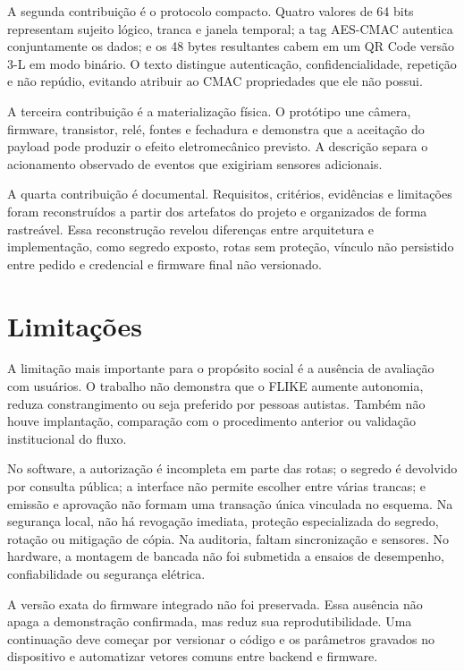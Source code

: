 A segunda contribuição é o protocolo compacto. Quatro valores de 64 bits representam sujeito lógico, tranca e janela temporal; a tag AES-CMAC autentica conjuntamente os dados; e os 48 bytes resultantes cabem em um QR Code versão 3-L em modo binário. O texto distingue autenticação, confidencialidade, repetição e não repúdio, evitando atribuir ao CMAC propriedades que ele não possui.

A terceira contribuição é a materialização física. O protótipo une câmera, firmware, transistor, relé, fontes e fechadura e demonstra que a aceitação do payload pode produzir o efeito eletromecânico previsto. A descrição separa o acionamento observado de eventos que exigiriam sensores adicionais.

A quarta contribuição é documental. Requisitos, critérios, evidências e limitações foram reconstruídos a partir dos artefatos do projeto e organizados de forma rastreável. Essa reconstrução revelou diferenças entre arquitetura e implementação, como segredo exposto, rotas sem proteção, vínculo não persistido entre pedido e credencial e firmware final não versionado.

\section{Limitações}

A limitação mais importante para o propósito social é a ausência de avaliação com usuários. O trabalho não demonstra que o FLIKE aumente autonomia, reduza constrangimento ou seja preferido por pessoas autistas. Também não houve implantação, comparação com o procedimento anterior ou validação institucional do fluxo.

No software, a autorização é incompleta em parte das rotas; o segredo é devolvido por consulta pública; a interface não permite escolher entre várias trancas; e emissão e aprovação não formam uma transação única vinculada no esquema. Na segurança local, não há revogação imediata, proteção especializada do segredo, rotação ou mitigação de cópia. Na auditoria, faltam sincronização e sensores. No hardware, a montagem de bancada não foi submetida a ensaios de desempenho, confiabilidade ou segurança elétrica.

A versão exata do firmware integrado não foi preservada. Essa ausência não apaga a demonstração confirmada, mas reduz sua reprodutibilidade. Uma continuação deve começar por versionar o código e os parâmetros gravados no dispositivo e automatizar vetores comuns entre backend e firmware.

